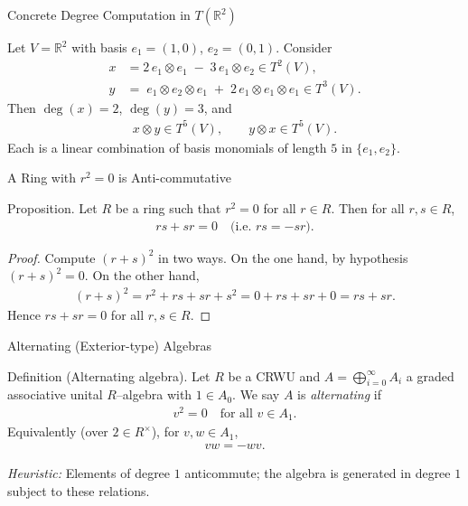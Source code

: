\begin{frame}{Concrete Degree Computation in $T(\mathbb{R}^2)$}
\begin{block}{}
Let $V=\mathbb{R}^2$ with basis $e_1=(1,0)$, $e_2=(0,1)$. Consider
\begin{align*}
x &= 2\,e_1\otimes e_1 \;-\; 3\,e_1\otimes e_2 \in T^2(V),\\
y &= \;e_1\otimes e_2\otimes e_1 \;+\; 2\,e_1\otimes e_1\otimes e_1 \in T^3(V).
\end{align*}
Then $\deg(x)=2$, $\deg(y)=3$, and
\begin{align*}
x\otimes y \in T^{5}(V),\qquad
y\otimes x \in T^{5}(V).
\end{align*}
Each is a linear combination of basis monomials of length $5$ in $\{e_1,e_2\}$.
\end{block}
\end{frame}

\begin{frame}{A Ring with $r^2=0$ is Anti-commutative}
\begin{block}{Proposition.}
Let $R$ be a ring such that $r^2=0$ for all $r\in R$. Then for all $r,s\in R$,
\begin{align*}
rs + sr = 0 \quad \text{(i.e.\ $rs=-sr$).}
\end{align*}
\end{block}

\begin{proof}
Compute $(r+s)^2$ in two ways. On the one hand, by hypothesis $(r+s)^2=0$.
On the other hand,
\begin{align*}
(r+s)^2 = r^2 + rs + sr + s^2 = 0 + rs + sr + 0 = rs + sr.
\end{align*}
Hence $rs+sr=0$ for all $r,s\in R$.
\end{proof}
\end{frame}

\begin{frame}{Alternating (Exterior-type) Algebras}
\begin{block}{Definition (Alternating algebra).}
Let $R$ be a CRWU and $A=\bigoplus_{i=0}^\infty A_i$ a graded associative unital $R$–algebra with $1\in A_0$.
We say $A$ is \emph{alternating} if
\begin{align*}
v^2=0 \quad \text{for all } v\in A_1.
\end{align*}
Equivalently (over $2\in R^\times$), for $v,w\in A_1$,
\begin{align*}
vw = -wv.
\end{align*}
\end{block}
\textit{Heuristic:} Elements of degree $1$ anticommute; the algebra is generated in degree $1$ subject to these relations.
\end{frame}

